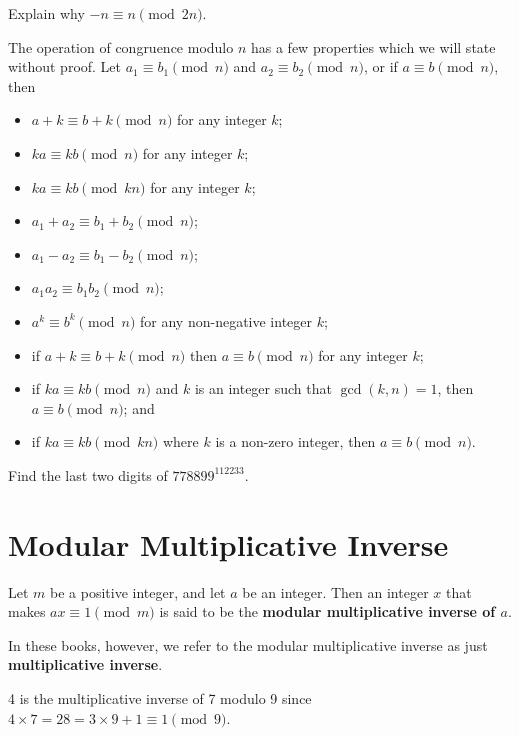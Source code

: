 \begin{exercise}
    Explain why $-n \equiv n \pmod{2n}$.
\end{exercise}

The operation of congruence modulo $n$ has a few properties which we will state without proof. Let $a_1 \equiv b_1 \pmod n$ and $a_2 \equiv b_2 \pmod n$, or if $a \equiv b \pmod n$, then
\begin{itemize}
    \item $a + k \equiv b + k \pmod n$ for any integer $k$;
    \item $ka \equiv kb \pmod n$ for any integer $k$;
    \item $ka \equiv kb \pmod {kn}$ for any integer $k$;
    \item $a_1 + a_2 \equiv b_1 + b_2 \pmod n$;
    \item $a_1 - a_2 \equiv b_1 - b_2 \pmod n$;
    \item $a_1a_2 \equiv b_1b_2 \pmod n$;
    \item $a^k \equiv b^k \pmod n$ for any non-negative integer $k$;
    \item if $a+k \equiv b+k \pmod n$ then $a \equiv b \pmod n$ for any integer $k$;
    \item if $ka \equiv kb \pmod n$ and $k$ is an integer such that $\gcd(k, n) = 1$, then $a \equiv b \pmod n$; and
    \item if $ka \equiv kb \pmod{kn}$ where $k$ is a non-zero integer, then $a \equiv b \pmod n$.
\end{itemize}

\begin{exercise}
    Find the last two digits of $778899^{112233}$.
\end{exercise}

\section{Modular Multiplicative Inverse}
\begin{definition}
    Let $m$ be a positive integer, and let $a$ be an integer. Then an integer $x$ that makes $ax \equiv 1 \pmod m$ is said to be the \textbf{modular multiplicative inverse of $a$}.
\end{definition}
\begin{remark}
    In these books, however, we refer to the modular multiplicative inverse as just \textbf{multiplicative inverse}.
\end{remark}
\begin{example}
    4 is the multiplicative inverse of 7 modulo 9 since $4 \times 7 = 28 = 3 \times 9 + 1 \equiv 1 \pmod 9$.
\end{example}

